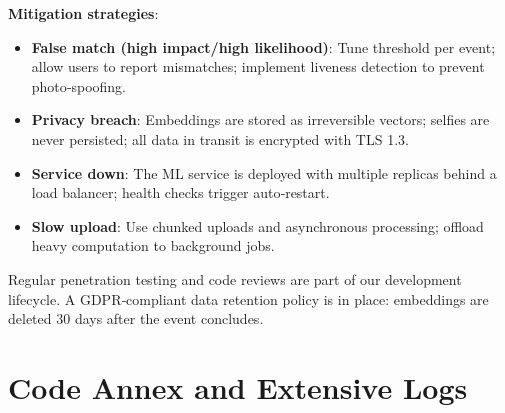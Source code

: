 \documentclass[12pt,a4paper]{article}
\begin{document}
\begin{center}
\end{center}

\textbf{Mitigation strategies}:
\begin{itemize}
    \item \textbf{False match (high impact/high likelihood)}: Tune threshold per event; allow users to report mismatches; implement liveness detection to prevent photo‑spoofing.
    \item \textbf{Privacy breach}: Embeddings are stored as irreversible vectors; selfies are never persisted; all data in transit is encrypted with TLS 1.3.
    \item \textbf{Service down}: The ML service is deployed with multiple replicas behind a load balancer; health checks trigger auto‑restart.
    \item \textbf{Slow upload}: Use chunked uploads and asynchronous processing; offload heavy computation to background jobs.
\end{itemize}

Regular penetration testing and code reviews are part of our development lifecycle. A GDPR‑compliant data retention policy is in place: embeddings are deleted 30 days after the event concludes.

\newpage

\section{Code Annex and Extensive Logs}
\end{document}
